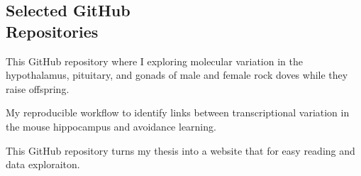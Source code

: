 \documentclass[margin,line]{CV}
\begin{document}
\begin{resume}

\section{\mysidestyle Selected GitHub \\Repositories}

\begin{description}
\setlength{\itemsep}{3pt}

\item [\href{https://github.com/macmanes-lab/DoveParentsRNAseq}{DoveParentsRNAseq}] This GitHub repository where I exploring molecular variation in the hypothalamus, pituitary, and gonads of male and female rock doves while they raise offspring.


\item [\href{https://github.com/raynamharris/IntegrativeProjectWT2015}{IntegrativeProjectWT2015}] My reproducible workflow to identify links between transcriptional variation in the mouse hippocampus and avoidance learning.

\item [\href{https://github.com/raynamharris/Thesis}{Thesis}] This GitHub repository turns my thesis into a website that for easy reading and data exploraiton.



\end{description}



\end{resume}
\end{document}
